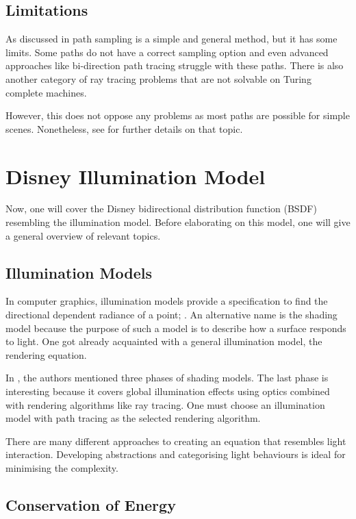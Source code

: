 \subsection{Limitations}

As discussed in \cite{veach_robust_1997} path sampling is a simple and general method, but it has some limits.
Some paths do not have a correct sampling option and even advanced approaches like bi-direction path tracing struggle with these paths.
There is also another category of ray tracing problems that are not solvable on Turing complete machines.

However, this does not oppose any problems as most paths are possible for simple scenes.
Nonetheless, see \cite{veach_robust_1997} for further details on that topic.

\section{Disney Illumination Model}

Now, one will cover the Disney bidirectional distribution function (BSDF) resembling the illumination model.
Before elaborating on this model, one will give a general overview of relevant topics.

\subsection{Illumination Models}

In computer graphics, illumination models provide a specification to find the directional dependent radiance of a point; \cite{duin_beleuchtungsalgorithmen_1993}. 
An alternative name is the shading model because the purpose of such a model is to describe how a surface responds to light.
One got already acquainted with a general illumination model, the rendering equation.

In \cite{duin_beleuchtungsalgorithmen_1993}, the authors mentioned three phases of shading models.
The last phase is interesting because it covers global illumination effects using optics combined with rendering algorithms like ray tracing.
One must choose an illumination model with path tracing as the selected rendering algorithm.

There are many different approaches to creating an equation that resembles light interaction.
Developing abstractions and categorising light behaviours is ideal for minimising the complexity.

\subsection{Conservation of Energy}

